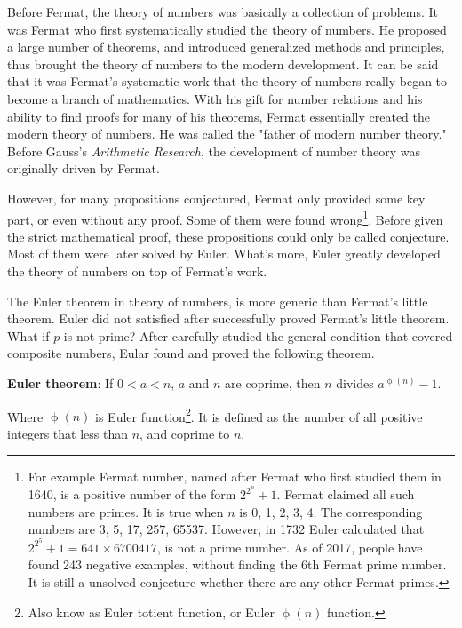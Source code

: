 \documentclass[b5paper]{article}
\begin{document}
Before Fermat, the theory of numbers was basically a collection of problems. It was Fermat who first systematically studied the theory of numbers. He proposed a large number of theorems, and introduced generalized methods and principles, thus brought the theory of numbers to the modern development. It can be said that it was Fermat's systematic work that the theory of numbers really began to become a branch of mathematics. With his gift for number relations and his ability to find proofs for many of his theorems, Fermat essentially created the modern theory of numbers. He was called the "father of modern number theory." Before Gauss's {\em Arithmetic Research}, the development of number theory was originally driven by Fermat.

However, for many propositions conjectured, Fermat only provided some key part, or even without any proof. Some of them were found wrong\footnote{For example Fermat number, named after Fermat who first studied them in 1640, is a positive number of the form $2^{2^n}+1$. Fermat claimed all such numbers are primes. It is true when $n$ is 0, 1, 2, 3, 4. The corresponding numbers are 3, 5, 17, 257, 65537. However, in 1732 Euler calculated that $2^{2^5} + 1 = 641 \times 6700417$, is not a prime number. As of 2017, people have found 243 negative examples, without finding the 6th Fermat prime number. It is still a unsolved conjecture whether there are any other Fermat primes.}. Before given the strict mathematical proof, these propositions could only be called conjecture. Most of them were later solved by Euler. What's more, Euler greatly developed the theory of numbers on top of Fermat's work.

The Euler theorem in theory of numbers, is more generic than Fermat's little theorem. Euler did not satisfied after successfully proved Fermat's little theorem. What if $p$ is not prime? After carefully studied the general condition that covered composite numbers, Eular found and proved the following theorem.

 
\begin{theorem}
\textbf{Euler theorem}: If $0 < a < n$, $a$ and $n$ are coprime, then $n$ divides $a^{\upphi(n)} - 1$.
\end{theorem}

Where $\upphi(n)$ is Euler function\footnote{Also know as Euler totient function, or Euler $\upphi(n)$ function.}. It is defined as the number of all positive integers that less than $n$, and coprime to $n$.
\end{document}
